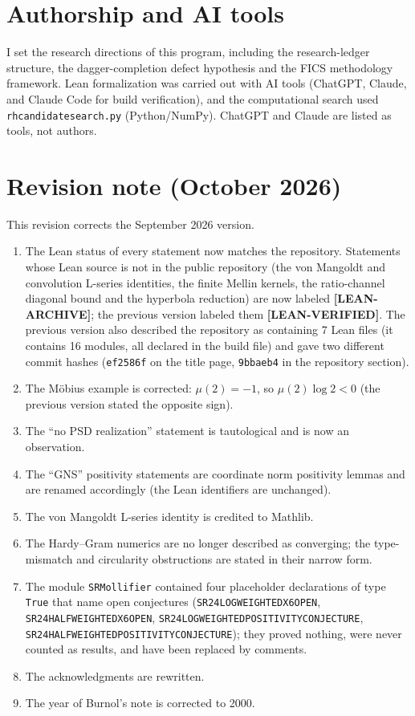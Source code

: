 \documentclass[11pt]{article}
\theoremstyle{remark}
\newcommand{\LEANVERIFIED}{\textbf{\color{green!60!black}[LEAN-VERIFIED]}}
\newcommand{\LEANARCHIVE}{\textbf{\color{gray}[LEAN-ARCHIVE]}}
\DeclareRobustCommand{\_}{\ifmmode\text{\textunderscore}\else\textunderscore\allowbreak\fi}
\begin{document}
\section*{Authorship and AI tools}

I set the research directions of this program, including the research-ledger structure, the dagger-completion defect hypothesis and the FICS methodology framework. Lean formalization was carried out with AI tools (ChatGPT, Claude, and Claude Code for build verification), and the computational search used \texttt{rh\_candidate\_search.py} (Python/NumPy). ChatGPT and Claude are listed as tools, not authors.


\section*{Revision note (October 2026)}
This revision corrects the September 2026 version.
\begin{enumerate}[leftmargin=*]
\item The Lean status of every statement now matches the repository. Statements whose Lean source is not in the public repository (the von Mangoldt and convolution L-series identities, the finite Mellin kernels, the ratio-channel diagonal bound and the hyperbola reduction) are now labeled \LEANARCHIVE{}; the previous version labeled them \LEANVERIFIED{}. The previous version also described the repository as containing 7 Lean files (it contains 16 modules, all declared in the build file) and gave two different commit hashes (\texttt{ef2586f} on the title page, \texttt{9bbaeb4} in the repository section).
\item The Möbius example is corrected: $\mu(2) = -1$, so $\mu(2)\log 2 < 0$ (the previous version stated the opposite sign).
\item The ``no PSD realization'' statement is tautological and is now an observation.
\item The ``GNS'' positivity statements are coordinate norm positivity lemmas and are renamed accordingly (the Lean identifiers are unchanged).
\item The von Mangoldt L-series identity is credited to Mathlib.
\item The Hardy--Gram numerics are no longer described as converging; the type-mismatch and circularity obstructions are stated in their narrow form.
\item The module \texttt{SR\_Mollifier} contained four placeholder declarations of type \texttt{True} that name open conjectures (\texttt{SR24\_LOG\_WEIGHTED\_X6\_OPEN}, \texttt{SR24\_HALF\_WEIGHTED\_X6\_OPEN}, \texttt{SR24\_LOG\_WEIGHTED\_POSITIVITY\_CONJECTURE}, \texttt{SR24\_HALF\_WEIGHTED\_POSITIVITY\_CONJECTURE}); they proved nothing, were never counted as results, and have been replaced by comments.
\item The acknowledgments are rewritten.
\item The year of Burnol's note is corrected to 2000.
\end{enumerate}
\end{document}
